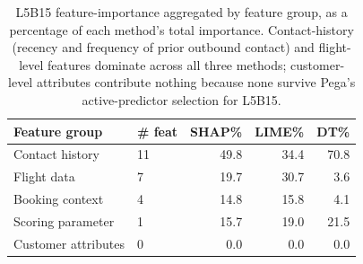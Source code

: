 \begin{table}[ht]
\caption{L5B15 feature-importance aggregated by feature group, as a percentage of each method's total importance. Contact-history (recency and frequency of prior outbound contact) and flight-level features dominate across all three methods; customer-level attributes contribute nothing because none survive Pega's active-predictor selection for L5B15.}
\label{tab:rq5_group_importance}
\centering
\begin{tabular}{llrrr}
\toprule
Feature group & \# feat & SHAP\% & LIME\% & DT\% \\
\midrule
Contact history & 11 & 49.8 & 34.4 & 70.8 \\
Flight data & 7 & 19.7 & 30.7 & 3.6 \\
Booking context & 4 & 14.8 & 15.8 & 4.1 \\
Scoring parameter & 1 & 15.7 & 19.0 & 21.5 \\
\midrule
Customer attributes & 0 & 0.0 & 0.0 & 0.0 \\
\bottomrule
\end{tabular}
\end{table}
